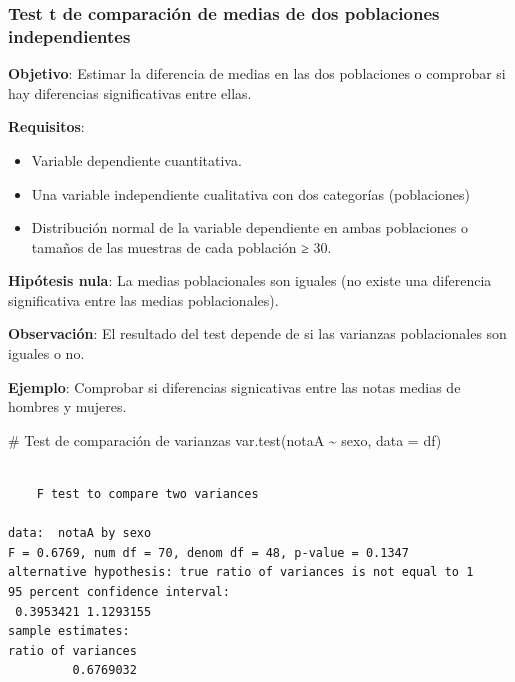 \documentclass[
  a4paper,
]{scrreport}
\newenvironment{Shaded}{\begin{snugshade}}{\end{snugshade}}
\newcommand{\AttributeTok}[1]{\textcolor[rgb]{0.40,0.45,0.13}{#1}}
\newcommand{\CommentTok}[1]{\textcolor[rgb]{0.37,0.37,0.37}{#1}}
\newcommand{\FunctionTok}[1]{\textcolor[rgb]{0.28,0.35,0.67}{#1}}
\newcommand{\NormalTok}[1]{\textcolor[rgb]{0.00,0.23,0.31}{#1}}
\newcommand{\SpecialCharTok}[1]{\textcolor[rgb]{0.37,0.37,0.37}{#1}}
\providecommand{\tightlist}{%
  \setlength{\itemsep}{0pt}\setlength{\parskip}{0pt}}\usepackage{longtable,booktabs,array}
\theoremstyle{definition}
\theoremstyle{definition}
\theoremstyle{remark}
\begin{document}
\hypertarget{test-t-de-comparaciuxf3n-de-medias-de-dos-poblaciones-independientes}{%
\subsubsection{Test t de comparación de medias de dos poblaciones
independientes}\label{test-t-de-comparaciuxf3n-de-medias-de-dos-poblaciones-independientes}}

\textbf{Objetivo}: Estimar la diferencia de medias en las dos
poblaciones o comprobar si hay diferencias significativas entre ellas.

\textbf{Requisitos}:

\begin{itemize}
\tightlist
\item
  Variable dependiente cuantitativa.
\item
  Una variable independiente cualitativa con dos categorías
  (poblaciones)
\item
  Distribución normal de la variable dependiente en ambas poblaciones o
  tamaños de las muestras de cada población ≥ 30.
\end{itemize}

\textbf{Hipótesis nula}: La medias poblacionales son iguales (no existe
una diferencia significativa entre las medias poblacionales).

\textbf{Observación}: El resultado del test depende de si las varianzas
poblacionales son iguales o no.

\textbf{Ejemplo}: Comprobar si diferencias signicativas entre las notas
medias de hombres y mujeres.

\begin{Shaded}
\begin{Highlighting}[]
\CommentTok{\# Test de comparación de varianzas}
\FunctionTok{var.test}\NormalTok{(notaA }\SpecialCharTok{\textasciitilde{}}\NormalTok{ sexo, }\AttributeTok{data =}\NormalTok{ df)}
\end{Highlighting}
\end{Shaded}

\begin{verbatim}

    F test to compare two variances

data:  notaA by sexo
F = 0.6769, num df = 70, denom df = 48, p-value = 0.1347
alternative hypothesis: true ratio of variances is not equal to 1
95 percent confidence interval:
 0.3953421 1.1293155
sample estimates:
ratio of variances 
         0.6769032 
\end{verbatim}
\end{document}
